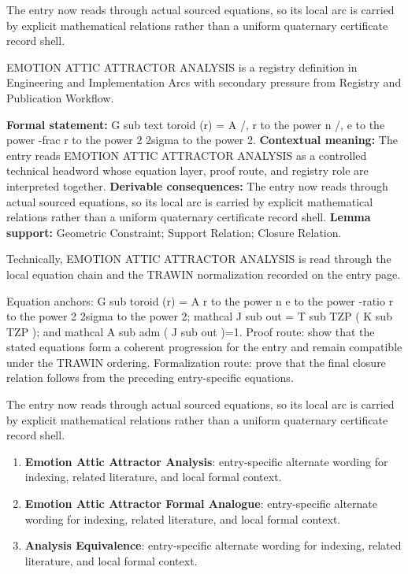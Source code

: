 The entry now reads through actual sourced equations, so its local arc is carried by explicit mathematical relations rather than a uniform quaternary certificate record shell.
\clearpage


\begingroup\small
{}
EMOTION ATTIC ATTRACTOR ANALYSIS is a registry definition in Engineering and Implementation Arcs with secondary pressure from Registry and Publication Workflow.

\begingroup\footnotesize\setlength{\emergencystretch}{3em}\sloppy
\textbf{Formal statement:} G sub text toroid (r) = A /, r to the power n /, e to the power -frac r to the power 2 2sigma to the power 2. \textbf{Contextual meaning:} The entry reads EMOTION ATTIC ATTRACTOR ANALYSIS as a controlled technical headword whose equation layer, proof route, and registry role are interpreted together. \textbf{Derivable consequences:} The entry now reads through actual sourced equations, so its local arc is carried by explicit mathematical relations rather than a uniform quaternary certificate record shell. \textbf{Lemma support:} Geometric Constraint; Support Relation; Closure Relation.\par
\endgroup

Technically, EMOTION ATTIC ATTRACTOR ANALYSIS is read through the local equation chain and the TRAWIN normalization recorded on the entry page.

Equation anchors: G sub toroid (r) = A r to the power n e to the power -ratio r to the power 2 2sigma to the power 2; mathcal J sub out = T sub TZP ( K sub TZP ); and mathcal A sub adm ( J sub out )=1. Proof route: show that the stated equations form a coherent progression for the entry and remain compatible under the TRAWIN ordering. Formalization route: prove that the final closure relation follows from the preceding entry-specific equations.

The entry now reads through actual sourced equations, so its local arc is carried by explicit mathematical relations rather than a uniform quaternary certificate record shell.
\endgroup

\begin{enumerate}[leftmargin=1.6em,itemsep=6pt,topsep=4pt]
\item \textbf{Emotion Attic Attractor Analysis}: entry-specific alternate wording for indexing, related literature, and local formal context.
\item \textbf{Emotion Attic Attractor Formal Analogue}: entry-specific alternate wording for indexing, related literature, and local formal context.
\item \textbf{Analysis Equivalence}: entry-specific alternate wording for indexing, related literature, and local formal context.
\end{enumerate}

